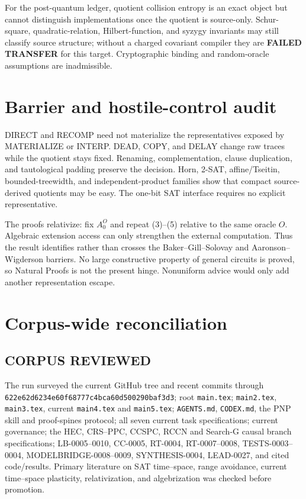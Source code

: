 \documentclass[11pt]{article}
\begin{document}
For the post-quantum ledger, quotient collision entropy is an exact object but
cannot distinguish implementations once the quotient is source-only.
Schur-square, quadratic-relation, Hilbert-function, and syzygy invariants may
still classify source structure; without a charged covariant compiler they
are \textbf{FAILED TRANSFER} for this target.  Cryptographic binding and
random-oracle assumptions are inadmissible.

\section{Barrier and hostile-control audit}

DIRECT and RECOMP need not materialize the representatives exposed by
MATERIALIZE or INTERP.  DEAD, COPY, and DELAY change raw traces while the
quotient stays fixed.  Renaming, complementation, clause duplication, and
tautological padding preserve the decision.  Horn, 2-SAT, affine/Tseitin,
bounded-treewidth, and independent-product families show that compact
source-derived quotients may be easy.  The one-bit SAT interface requires no
explicit representative.

The proofs relativize: fix $A_0^O$ and repeat (3)--(5) relative to the same
oracle $O$.  Algebraic extension access can only strengthen the external
computation.  Thus the result identifies rather than crosses the
Baker--Gill--Solovay and Aaronson--Wigderson barriers.  No large constructive
property of general circuits is proved, so Natural Proofs is not the present
hinge.  Nonuniform advice would only add another representation escape.

\section{Corpus-wide reconciliation}

\subsection*{CORPUS REVIEWED}
The run surveyed the current GitHub tree and recent commits through
\nolinkurl{622e62d6234e60f68777c4bca60d500290baf3d3}; root
\texttt{main.tex}; \texttt{main2.tex}, \texttt{main3.tex}, current
\texttt{main4.tex} and \texttt{main5.tex}; \texttt{AGENTS.md},
\texttt{CODEX.md}, the PNP skill and proof-spines protocol; all seven current
task specifications; current governance; the HEC, CRS--PPC, CCSPC, RCCN and
Search-G causal branch specifications; LB-0005--0010, CC-0005, RT-0004,
RT-0007--0008, TESTS-0003--0004, MODELBRIDGE-0008--0009, SYNTHESIS-0004,
LEAD-0027, and cited code/results.  Primary literature on SAT time--space,
range avoidance, current time--space plasticity, relativization, and
algebrization was checked before promotion.
\end{document}
